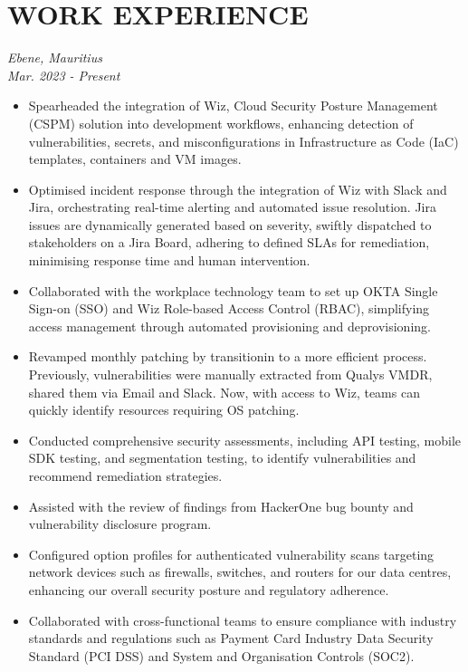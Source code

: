 \documentclass[a4paper, fleqn, oneside]{article}
\begin{document}
\section{WORK EXPERIENCE}
\label{sec:orgc114c2c}
{ \hfill \textit{Ebene, Mauritius}} \\
{ \hfill {\textit{Mar. 2023 - Present}}}
\begin{itemize}
\item Spearheaded the integration of Wiz, Cloud Security Posture Management (CSPM) solution into development workflows, enhancing detection of vulnerabilities, secrets, and misconfigurations in Infrastructure as Code (IaC) templates, containers and VM images.
\item Optimised incident response through the integration of Wiz with Slack and Jira, orchestrating real-time alerting and automated issue resolution. Jira issues are dynamically generated based on severity, swiftly dispatched to stakeholders on a Jira Board, adhering to defined SLAs for remediation, minimising response time and human intervention.
\item Collaborated with the workplace technology team to set up OKTA Single Sign-on (SSO) and Wiz Role-based Access Control (RBAC), simplifying access management through automated provisioning and deprovisioning.
\item Revamped monthly patching by transitionin to a more efficient process. Previously, vulnerabilities were manually extracted from Qualys VMDR, shared them via Email and Slack. Now, with access to Wiz, teams can quickly identify resources requiring OS patching.
\item Conducted comprehensive security assessments, including API testing, mobile SDK testing, and segmentation testing, to identify vulnerabilities and recommend remediation strategies.
\item Assisted with the review of findings from HackerOne bug bounty and vulnerability disclosure program.
\item Configured option profiles for authenticated vulnerability scans targeting network devices such as firewalls, switches, and routers for our data centres, enhancing our overall security posture and regulatory adherence.
\item Collaborated with cross-functional teams to ensure compliance with industry standards and regulations such as Payment Card Industry Data Security Standard (PCI DSS) and System and Organisation Controls (SOC2).
\end{itemize}
\end{document}
